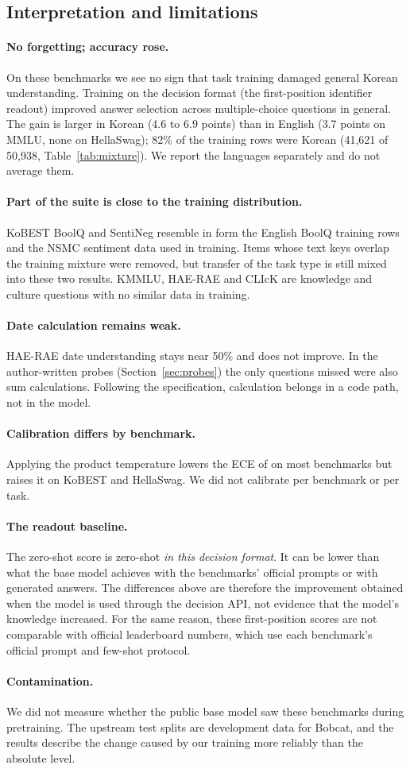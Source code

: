 \subsection{Interpretation and limitations}

\paragraph{No forgetting; accuracy rose.}
On these benchmarks we see no sign that task training damaged general Korean understanding.
Training on the decision format (the first-position identifier readout) improved answer
selection across multiple-choice questions in general. The gain is larger in Korean (4.6 to
6.9 points) than in English (3.7 points on MMLU, none on HellaSwag); 82\% of the training rows
were Korean (41,621 of 50,938, Table~\ref{tab:mixture}). We report the languages separately
and do not average them.

\paragraph{Part of the suite is close to the training distribution.}
KoBEST BoolQ and SentiNeg resemble in form the English BoolQ training rows and the NSMC
sentiment data used in training. Items whose text keys overlap the training mixture were
removed, but transfer of the task type is still mixed into these two results. KMMLU, HAE-RAE
and CLIcK are knowledge and culture questions with no similar data in training.

\paragraph{Date calculation remains weak.}
HAE-RAE date understanding stays near 50\% and does not improve. In the author-written probes
(Section~\ref{sec:probes}) the only questions \expone{} missed were also sum calculations.
Following the specification, calculation belongs in a code path, not in the model.

\paragraph{Calibration differs by benchmark.}
Applying the product temperature lowers the ECE of \expone{} on most benchmarks but raises it
on KoBEST and HellaSwag. We did not calibrate per benchmark or per task.

\paragraph{The readout baseline.}
The zero-shot score is zero-shot \emph{in this decision format}. It can be lower than what the
base model achieves with the benchmarks' official prompts or with generated answers. The
differences above are therefore the improvement obtained when the model is used through the
decision API, not evidence that the model's knowledge increased. For the same reason, these
first-position scores are not comparable with official leaderboard numbers, which use each
benchmark's official prompt and few-shot protocol.

\paragraph{Contamination.}
We did not measure whether the public base model saw these benchmarks during pretraining. The
upstream test splits are development data for Bobcat, and the results describe the change
caused by our training more reliably than the absolute level.
